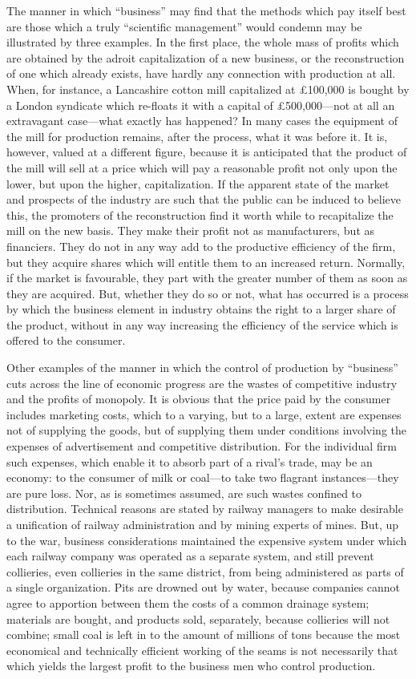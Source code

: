 \documentclass{book}
\begin{document}
The manner in which “business” may find that the methods which pay itself best are those which a truly “scientific management” would condemn may be illustrated by three examples. In the first place, the whole mass of profits which are obtained by the adroit capitalization of a new business, or the reconstruction of one which already exists, have hardly any connection with production at all. When, for instance, a Lancashire cotton mill capitalized at £100,000 is bought by a London syndicate which re-floats it with a capital of £500,000—not at all an extravagant case—what exactly has happened? In many cases the equipment of the mill for production remains, after the process, what it was before it. It is, however, valued at a different figure, because it is anticipated that the product of the mill will sell at a price which will pay a reasonable profit not only upon the lower, but upon the higher, capitalization. If the apparent state of the market and prospects of the industry are such that the public can be induced to believe this, the promoters of the reconstruction find it worth while to recapitalize the mill on the new basis. They make their profit not as manufacturers, but as financiers. They do not in any way add to the productive efficiency of the firm, but they acquire shares which will entitle them to an increased return. Normally, if the market is favourable, they part with the greater number of them as soon as they are acquired. But, whether they do so or not, what has occurred is a process by which the business element in industry obtains the right to a larger share of the product, without in any way increasing the efficiency of the service which is offered to the consumer.

Other examples of the manner in which the control of production by “business” cuts across the line of economic progress are the wastes of competitive industry and the profits of monopoly. It is obvious that the price paid by the consumer includes marketing costs, which to a varying, but to a large, extent are expenses not of supplying the goods, but of supplying them under conditions involving the expenses of advertisement and competitive distribution. For the individual firm such expenses, which enable it to absorb part of a rival’s trade, may be an economy: to the consumer of milk or coal—to take two flagrant instances—they are pure loss. Nor, as is sometimes assumed, are such wastes confined to distribution. Technical reasons are stated by railway managers to make desirable a unification of railway administration and by mining experts of mines. But, up to the war, business considerations maintained the expensive system under which each railway company was operated as a separate system, and still prevent collieries, even collieries in the same district, from being administered as parts of a single organization. Pits are drowned out by water, because companies cannot agree to apportion between them the costs of a common drainage system; materials are bought, and products sold, separately, because collieries will not combine; small coal is left in to the amount of millions of tons because the most economical and technically efficient working of the seams is not necessarily that which yields the largest profit to the business men who control production.
\end{document}

